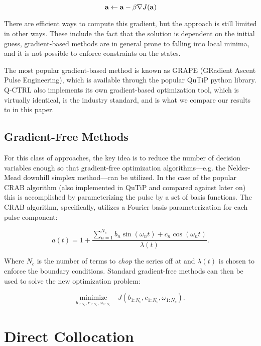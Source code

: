 \documentclass{article}
\newcommand{\minimize}[1]{\underset{#1}{\text{minimize}}}
\begin{document}
\begin{equation}
  \vb{a} \leftarrow \vb{a} - \beta \nabla J(\vb{a})
\end{equation}

There are efficient ways to compute this gradient, but the approach is still limited in other ways.  These include the fact that the solution is dependent on the initial guess, gradient-based methods are in general prone to falling into local minima, and it is not possible to enforce constraints on the states.

The most popular gradient-based method is known as GRAPE (GRadient Ascent Pulse Engineering), which is available through the popular QuTiP python library.  Q-CTRL also implements its own gradient-based optimization tool, which is virtually identical, is the industry standard, and is what we compare our results to in this paper.

\subsection{Gradient-Free Methods}
For this class of approaches, the key idea is to reduce the number of decision variables enough so that gradient-free optimization algorithms---e.g. the Nelder-Mead downhill simplex method---can be utilized. In the case of the popular CRAB algorithm (also implemented in QuTiP and compared against later on) this is accomplished by parameterizing the pulse by a set of basis functions.  The CRAB algorithm, specifically, utilizes a Fourier basis parameterization for each pulse component:

\begin{equation}
  a(t) = 1 + \frac{\sum_{n=1}^{N_c} b_n \sin(\omega_n t) + c_n \cos(\omega_n t)}{\lambda(t)}.
\end{equation}

\noindent
Where $N_c$ is the number of terms to \textit{chop} the series off at and $\lambda(t)$ is chosen to enforce the boundary conditions. Standard gradient-free methods can then be used to solve the new optimization problem:

\begin{equation}
  \minimize{b_{1:N_c}, c_{1:N_c}, \omega_{1:N_c}} \quad J(b_{1:N_c}, c_{1:N_c}, \omega_{1:N_c}).
\end{equation}
  


\newpage
\section{Direct Collocation}
\end{document}
